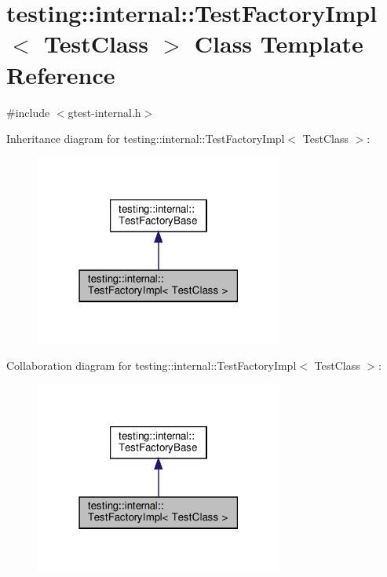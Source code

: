 \hypertarget{classtesting_1_1internal_1_1_test_factory_impl}{}\section{testing\+:\+:internal\+:\+:Test\+Factory\+Impl$<$ Test\+Class $>$ Class Template Reference}
\label{classtesting_1_1internal_1_1_test_factory_impl}


{\ttfamily \#include $<$gtest-\/internal.\+h$>$}



Inheritance diagram for testing\+:\+:internal\+:\+:Test\+Factory\+Impl$<$ Test\+Class $>$\+:
\nopagebreak
\begin{figure}[H]
\begin{center}
\leavevmode
\includegraphics[width=231pt]{classtesting_1_1internal_1_1_test_factory_impl__inherit__graph}
\end{center}
\end{figure}


Collaboration diagram for testing\+:\+:internal\+:\+:Test\+Factory\+Impl$<$ Test\+Class $>$\+:
\nopagebreak
\begin{figure}[H]
\begin{center}
\leavevmode
\includegraphics[width=231pt]{classtesting_1_1internal_1_1_test_factory_impl__coll__graph}
\end{center}
\end{figure}
